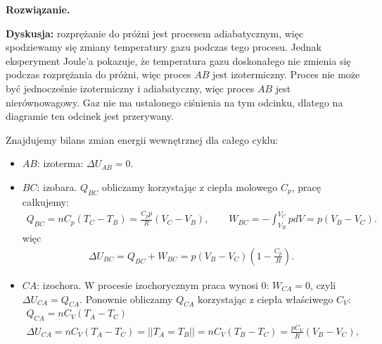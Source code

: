 \documentclass[11pt,a4paper]{article}
\newenvironment{solution}{\vspace{1cm} \par\textbf{Rozwiązanie.} \vspace{1cm}}{}
\begin{document}
\begin{solution}

\begin{center}
\end{center}

{\bf Dyskusja:} rozprężanie do próżni jest procesem adiabatycznym, więc spodziewamy 
się zmiany temperatury gazu podczas tego procesu. 
Jednak eksperyment Joule'a pokazuje, że temperatura gazu doskonałego nie zmienia się 
podczas rozprężania do próżni, więc proces $AB$ jest izotermiczny.
Proces nie może być jednocześnie izotermiczny i adiabatyczny, 
więc proces $AB$ jest nierównowagowy. Gaz nie ma ustalonego ciśnienia 
na tym odcinku, dlatego na diagramie ten odcinek jest przerywany.

\vspace{0.2cm}

Znajdujemy bilans zmian energii wewnętrznej dla całego cyklu:

\begin{itemize}
  \item $AB$: izoterma: $\Delta U_{AB} = 0$.
	\item $BC$: izobara. $Q_{BC}$ obliczamy korzystając z ciepła molowego $C_p$, pracę całkujemy:
	\begin{align*}
	       Q_{BC} = n C_p (T_C - T_B) = \frac{C_p p }{R}(V_C - V_B), \qquad 
         W_{BC} = -\int_{V_B}^{V_C} p dV = p (V_B - V_C).
	\end{align*}
	więc
	\begin{align*}
		\Delta U_{BC} = Q_{BC} + W_{BC} = p (V_B - V_C) \left(1 - \frac{C_p}{R} \right).
	\end{align*}
	\item $CA$: izochora. W procesie izochorycznym praca wynosi $0$: $W_{CA} = 0$, 
   czyli $\Delta U_{CA} = Q_{CA}$. Ponownie obliczamy $Q_{CA}$ korzystając z 
   ciepła właściwego $C_V$:
	\begin{align*}
    Q_{CA} = n C_V (T_A - T_C) \\
		\Delta U_{CA} = n C_V (T_A - T_C) = || T_A = T_B || =  n C_V (T_B - T_C) = \frac{p C_V}{R}(V_B - V_C),
	\end{align*}



\end{itemize}
\end{solution}
\end{document}
